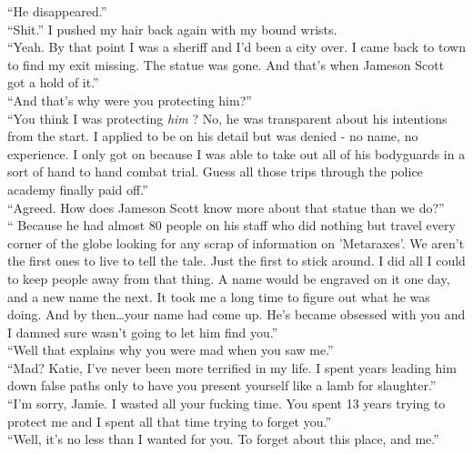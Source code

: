 \documentclass[a5paper]{scrartcl}
\begin{document}
\enquote{He disappeared.}\\


\enquote{Shit.} I pushed my hair back again with my bound wrists.\\


\enquote{Yeah. By that point I was a sheriff and I'd been a city over. I came back to town to find my exit missing. The statue was gone. And that's when Jameson Scott got a hold of it.}\\


\enquote{And that's why were you protecting him?}\\


\enquote{You think I was protecting \textit{him}
? No, he was transparent about his intentions from the start. I applied to be on his detail but was denied - no name, no experience. I only got on because I was able to take out all of his bodyguards in a sort of hand to hand combat trial. Guess all those trips through the police academy finally paid off.}\\


\enquote{Agreed. How does Jameson Scott know more about that statue than we do?}\\


\enquote{ Because he had almost 80 people on his staff who did nothing but travel every corner of the globe looking for any scrap of information on 'Metaraxes'.  We aren't the first ones to live to tell the tale. Just the first to stick around.  I did all I could to keep people away from that thing. A name would be engraved on it one day, and a new name the next. It took me a long time to figure out what he was doing. And by then\dots your name had come up. He's became obsessed with you and I damned sure wasn't going to let him find you.}\\


\enquote{Well that explains why you were mad when you saw me.}\\


\enquote{Mad? Katie, I've never been more terrified in my life. I spent years leading him down false paths only to have you present yourself like a lamb for slaughter.}\\


\enquote{I'm sorry, Jamie. I wasted all your fucking time.  You spent 13 years trying to protect me and I spent all that time trying to forget you.} \\


\enquote{Well, it's no less than I wanted for you. To forget about this place, and me.}\\
\end{document}
